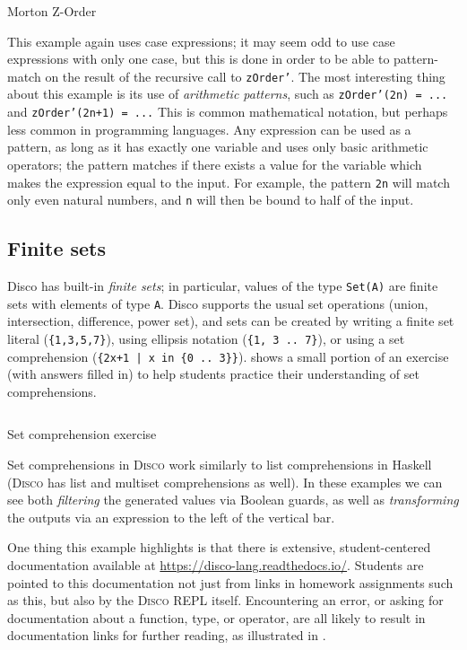 \documentclass[submission,copyright,creativecommons]{eptcs}
\newcommand{\disco}{\textsc{Disco}\xspace}
\newcommand{\pref}[1]{\prettyref{#1}}
\begin{document}
\begin{listing}[!htp]
\inputminted{text}{examples/zorder.disco}
\caption{Morton Z-Order}
\label{lst:zorder}
\end{listing}

This example again uses case expressions; it may seem odd to use case
expressions with only one case, but this is done in order to be able
to pattern-match on the result of the recursive call to
\texttt{zOrder'}.  The most interesting thing about this example is
its use of \emph{arithmetic patterns}, such as \texttt{zOrder'(2n) =
  ...}  and \texttt{zOrder'(2n+1) = ...}  This is common mathematical
notation, but perhaps less common in programming languages.  Any
expression can be used as a pattern, as long as it has exactly one
variable and uses only basic arithmetic operators; the pattern matches
if there exists a value for the variable which makes the expression
equal to the input.  For example, the pattern \texttt{2n} will match
only even natural numbers, and \texttt{n} will then be bound to half
of the input.

\subsection{Finite sets}

Disco has built-in \emph{finite sets}; in particular, values of the
type \texttt{Set(A)} are finite sets with elements of type
\texttt{A}. Disco supports the usual set operations (union,
intersection, difference, power set), and sets can be created by
writing a finite set literal (\verb|{1,3,5,7}|), using ellipsis
notation (\verb|{1, 3 .. 7}|), or using a set comprehension
(\verb-{2x+1 | x in {0 .. 3}}-). \pref{lst:sets} shows a small portion
of an exercise (with answers filled in) to help students practice
their understanding of set comprehensions.

\begin{listing}[!htp]
\inputminted{text}{examples/sets.disco}
\caption{Set comprehension exercise}
\label{lst:sets}
\end{listing}

Set comprehensions in \disco work similarly to list comprehensions in
Haskell (\disco has list and multiset comprehensions as well).  In
these examples we can see both \emph{filtering} the generated values via
Boolean guards, as well as \emph{transforming} the outputs via an
expression to the left of the vertical bar.

One thing this example highlights is that there is extensive,
student-centered documentation available at
\url{https://disco-lang.readthedocs.io/}.  Students are pointed to
this documentation not just from links in homework assignments such as
this, but also by the \disco REPL itself. Encountering an error, or
asking for documentation about a function, type, or operator, are
all likely to result in documentation links for further reading, as
illustrated in \pref{lst:doc}.
\end{document}
